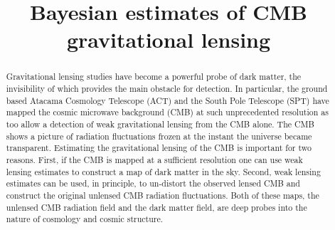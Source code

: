 \documentclass[noinfoline]{imsart}
\begin{document}
\begin{frontmatter}

\title{Bayesian estimates of CMB gravitational lensing}



\begin{abstract} 
Gravitational lensing studies have become a powerful probe of dark matter, the invisibility of which provides the main obstacle for detection. In particular, the ground based Atacama Cosmology Telescope (ACT)  and  the South Pole Telescope (SPT) have mapped the  cosmic microwave background (CMB)  at such unprecedented resolution as too allow a detection of weak gravitational lensing from the CMB alone.
The CMB shows a picture of radiation fluctuations frozen at the instant the universe became transparent. Estimating the gravitational lensing of the CMB  is important for two reasons. First, if the CMB is mapped at a sufficient resolution one can use weak lensing estimates to construct a map of dark matter in the sky.
Second,  weak lensing estimates  can be used, in principle,  to un-distort the observed lensed CMB and construct the original unlensed CMB radiation fluctuations. Both of these maps,  the unlensed CMB radiation field and the dark matter field, are deep probes into the nature of cosmology and cosmic structure. 
\end{abstract}


\begin{keyword}
\end{keyword}

\end{frontmatter}
\end{document}
